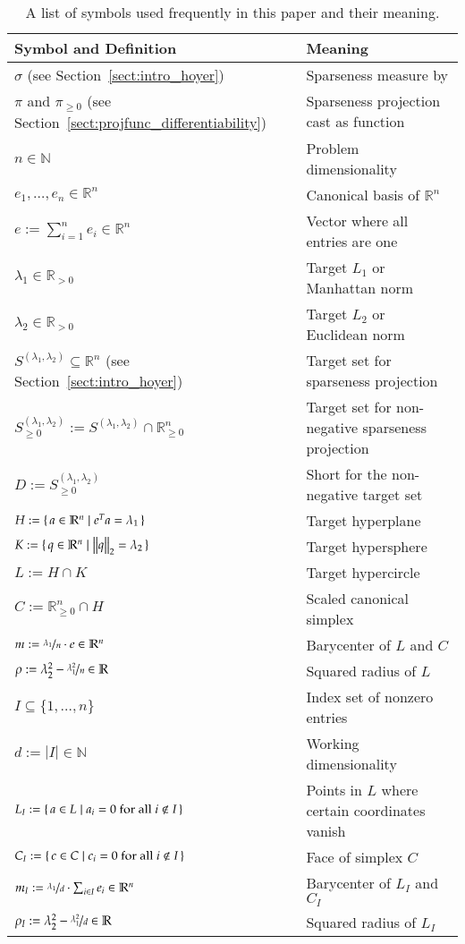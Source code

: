 \documentclass[twoside,11pt]{article}
\newcommand{\N}{\mathbb{N}}
\newcommand{\R}{\mathbb{R}}
\newcommand{\0}{\mathcal{O}}
\newcommand{\transp}{^T}
\newcommand{\norm}[1]{\left\Vert#1\right\Vert}
\newcommand{\abs}[1]{\left\vert #1 \right\vert}
\newcommand{\discint}[2]{\{#1,\dotsc,#2\}}
\begin{document}
\begin{table}[t]
  \centering
  \renewcommand{\arraystretch}{1.185}
  \begin{tabular}{l l}
    \toprule
    Symbol and Definition & Meaning\\\midrule
    $\sigma$ (see Section~\ref{sect:intro_hoyer}) & Sparseness measure by \citet{Hoyer2004}\\
    $\pi$ and $\pi_{\geq 0}$ (see Section~\ref{sect:projfunc_differentiability}) & Sparseness projection cast as function\\\midrule
    $n\in\N$ & Problem dimensionality\\
    $e_1,\dotsc,e_n\in\R^n$ & Canonical basis of $\R^n$\\
    $e := \sum_{i=1}^ne_i\in\R^n$ & Vector where all entries are one\\
    $\lambda_1\in\R_{> 0}$ & Target $L_1$ or Manhattan norm\\
    $\lambda_2\in\R_{> 0}$ & Target $L_2$ or Euclidean norm\\
    $S^{(\lambda_1,\lambda_2)} \subseteq \R^n$ (see Section~\ref{sect:intro_hoyer}) & Target set for sparseness projection\\
    $S_{\geq 0}^{(\lambda_1,\lambda_2)} := S^{(\lambda_1,\lambda_2)} \cap \R_{\geq 0}^n$ & Target set for non-negative sparseness projection\\\midrule
    $D := S_{\geq 0}^{(\lambda_1,\lambda_2)}$ & Short for the non-negative target set\\
    $H := \set{a\in\R^n | e\transp a = \lambda_1}$ & Target hyperplane\\
    $K := \set{q\in\R^n | \norm{q}_2 = \lambda_2}$ & Target hypersphere\\
    $L := H\cap K$ & Target hypercircle\\
    $C := \R_{\geq 0}^n\cap H$ & Scaled canonical simplex\\
    $m := \nicefrac{\lambda_1}{n}\cdot e\in\R^n$ & Barycenter of $L$ and $C$\\
    $\rho := \lambda_2^2 - \nicefrac{\lambda_1^2}{n}\in\R$ & Squared radius of $L$\\\midrule
    $I\subseteq\discint{1}{n}$ & Index set of nonzero entries\\
    $d := \abs{I}\in\N$ & Working dimensionality\\
    $L_I := \set{a\in L | a_i = 0\text{ for all }i\not\in I}$ & Points in $L$ where certain coordinates vanish\\
    $C_I := \set{c\in C | c_i = 0\text{ for all }i\not\in I}$ & Face of simplex $C$\\
    $m_I := \nicefrac{\lambda_1}{d}\cdot\sum_{i\in I}e_i\in\R^n$ & Barycenter of $L_I$ and $C_I$\\
    $\rho_I := \lambda_2^2 - \nicefrac{\lambda_1^2}{d}\in\R$ & Squared radius of $L_I$\\\bottomrule
  \end{tabular}
  \caption{A list of symbols used frequently in this paper and their meaning.}
  \label{tab:symbols}
\end{table}
\end{document}
